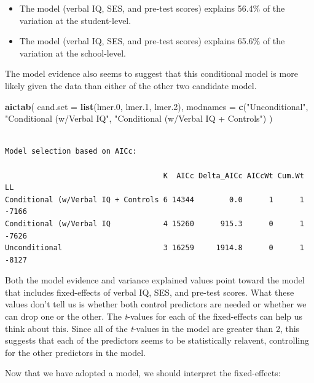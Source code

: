 \documentclass[]{book}
\newenvironment{Shaded}{\begin{snugshade}}{\end{snugshade}}
\newcommand{\DataTypeTok}[1]{\textcolor[rgb]{0.13,0.29,0.53}{#1}}
\newcommand{\FloatTok}[1]{\textcolor[rgb]{0.00,0.00,0.81}{#1}}
\newcommand{\KeywordTok}[1]{\textcolor[rgb]{0.13,0.29,0.53}{\textbf{#1}}}
\newcommand{\NormalTok}[1]{#1}
\newcommand{\StringTok}[1]{\textcolor[rgb]{0.31,0.60,0.02}{#1}}
\providecommand{\tightlist}{%
  \setlength{\itemsep}{0pt}\setlength{\parskip}{0pt}}
\begin{document}
\begin{itemize}
\tightlist
\item
  The model (verbal IQ, SES, and pre-test scores) explains 56.4\% of the variation at the student-level.
\item
  The model (verbal IQ, SES, and pre-test scores) explains 65.6\% of the variation at the school-level.
\end{itemize}

The model evidence also seems to suggest that this conditional model is more likely given the data than either of the other two candidate model.

\begin{Shaded}
\begin{Highlighting}[]
\KeywordTok{aictab}\NormalTok{(}
  \DataTypeTok{cand.set =} \KeywordTok{list}\NormalTok{(lmer}\FloatTok{.0}\NormalTok{, lmer}\FloatTok{.1}\NormalTok{, lmer}\FloatTok{.2}\NormalTok{), }
  \DataTypeTok{modnames =} \KeywordTok{c}\NormalTok{(}\StringTok{"Unconditional"}\NormalTok{, }\StringTok{"Conditional (w/Verbal IQ"}\NormalTok{, }\StringTok{"Conditional (w/Verbal IQ + Controls"}\NormalTok{)}
\NormalTok{)}
\end{Highlighting}
\end{Shaded}

\begin{verbatim}

Model selection based on AICc:

                                    K  AICc Delta_AICc AICcWt Cum.Wt    LL
Conditional (w/Verbal IQ + Controls 6 14344        0.0      1      1 -7166
Conditional (w/Verbal IQ            4 15260      915.3      0      1 -7626
Unconditional                       3 16259     1914.8      0      1 -8127
\end{verbatim}

Both the model evidence and variance explained values point toward the model that includes fixed-effects of verbal IQ, SES, and pre-test scores. What these values don't tell us is whether both control predictors are needed or whether we can drop one or the other. The \emph{t}-values for each of the fixed-effects can help us think about this. Since all of the \emph{t}-values in the model are greater than 2, this suggests that each of the predictors seems to be statistically relavent, controlling for the other predictors in the model.

Now that we have adopted a model, we should interpret the fixed-effects:
\end{document}
